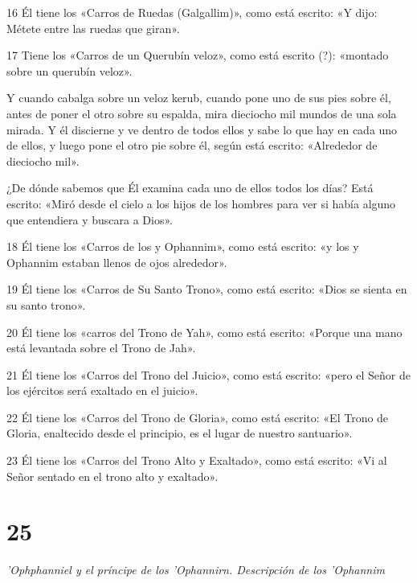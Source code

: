 \par 16 Él tiene los «Carros de Ruedas (Galgallim)», como está escrito: «Y dijo: Métete entre las ruedas que giran».

\par 17 Tiene los «Carros de un Querubín veloz», como está escrito (?): «montado sobre un querubín veloz».

\par Y cuando cabalga sobre un veloz kerub, cuando pone uno de sus pies sobre él, antes de poner el otro sobre su espalda, mira dieciocho mil mundos de una sola mirada. Y él discierne y ve dentro de todos ellos y sabe lo que hay en cada uno de ellos, y luego pone el otro pie sobre él, según está escrito: «Alrededor de dieciocho mil».

\par ¿De dónde sabemos que Él examina cada uno de ellos todos los días? Está escrito: «Miró desde el cielo a los hijos de los hombres para ver si había alguno que entendiera y buscara a Dios».

\par 18 Él tiene los «Carros de los y Ophannim», como está escrito: «y los y Ophannim estaban llenos de ojos alrededor».

\par 19 Él tiene los «Carros de Su Santo Trono», como está escrito: «Dios se sienta en su santo trono».

\par 20 Él tiene los «carros del Trono de Yah», como está escrito: «Porque una mano está levantada sobre el Trono de Jah».

\par 21 Él tiene los «Carros del Trono del Juicio», como está escrito: «pero el Señor de los ejércitos será exaltado en el juicio».

\par 22 Él tiene los «Carros del Trono de Gloria», como está escrito: «El Trono de Gloria, enaltecido desde el principio, es el lugar de nuestro santuario».

\par 23 Él tiene los «Carros del Trono Alto y Exaltado», como está escrito: «Vi al Señor sentado en el trono alto y exaltado».

\chapter{25}

\par \textit{'Ophphanniel y el príncipe de los 'Ophannirn. Descripción de los 'Ophannim}

